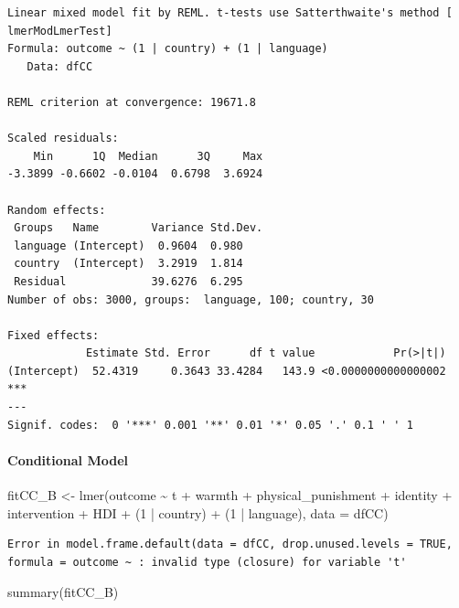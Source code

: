 \documentclass[
  letterpaper,
  DIV=11,
  numbers=noendperiod]{scrreprt}
\let\oldparagraph\paragraph
\renewcommand{\paragraph}[1]{\oldparagraph{#1}\mbox{}}
\newenvironment{Shaded}{\begin{snugshade}}{\end{snugshade}}
\newcommand{\AttributeTok}[1]{\textcolor[rgb]{0.40,0.45,0.13}{#1}}
\newcommand{\DecValTok}[1]{\textcolor[rgb]{0.68,0.00,0.00}{#1}}
\newcommand{\FunctionTok}[1]{\textcolor[rgb]{0.28,0.35,0.67}{#1}}
\newcommand{\NormalTok}[1]{\textcolor[rgb]{0.00,0.23,0.31}{#1}}
\newcommand{\OtherTok}[1]{\textcolor[rgb]{0.00,0.23,0.31}{#1}}
\newcommand{\SpecialCharTok}[1]{\textcolor[rgb]{0.37,0.37,0.37}{#1}}
\begin{document}
\begin{verbatim}
Linear mixed model fit by REML. t-tests use Satterthwaite's method [
lmerModLmerTest]
Formula: outcome ~ (1 | country) + (1 | language)
   Data: dfCC

REML criterion at convergence: 19671.8

Scaled residuals: 
    Min      1Q  Median      3Q     Max 
-3.3899 -0.6602 -0.0104  0.6798  3.6924 

Random effects:
 Groups   Name        Variance Std.Dev.
 language (Intercept)  0.9604  0.980   
 country  (Intercept)  3.2919  1.814   
 Residual             39.6276  6.295   
Number of obs: 3000, groups:  language, 100; country, 30

Fixed effects:
            Estimate Std. Error      df t value            Pr(>|t|)    
(Intercept)  52.4319     0.3643 33.4284   143.9 <0.0000000000000002 ***
---
Signif. codes:  0 '***' 0.001 '**' 0.01 '*' 0.05 '.' 0.1 ' ' 1
\end{verbatim}

\paragraph{Conditional Model}\label{conditional-model-4}

\begin{Shaded}
\begin{Highlighting}[]
\NormalTok{fitCC\_B }\OtherTok{\textless{}{-}} \FunctionTok{lmer}\NormalTok{(outcome }\SpecialCharTok{\textasciitilde{}}\NormalTok{ t }\SpecialCharTok{+}\NormalTok{ warmth }\SpecialCharTok{+}\NormalTok{ physical\_punishment }\SpecialCharTok{+} 
\NormalTok{                identity }\SpecialCharTok{+}\NormalTok{ intervention }\SpecialCharTok{+}\NormalTok{ HDI }\SpecialCharTok{+} 
\NormalTok{                (}\DecValTok{1} \SpecialCharTok{|}\NormalTok{ country) }\SpecialCharTok{+}
\NormalTok{                (}\DecValTok{1} \SpecialCharTok{|}\NormalTok{ language),}
              \AttributeTok{data =}\NormalTok{ dfCC)}
\end{Highlighting}
\end{Shaded}

\begin{verbatim}
Error in model.frame.default(data = dfCC, drop.unused.levels = TRUE, formula = outcome ~ : invalid type (closure) for variable 't'
\end{verbatim}

\begin{Shaded}
\begin{Highlighting}[]
\FunctionTok{summary}\NormalTok{(fitCC\_B)}
\end{Highlighting}
\end{Shaded}
\end{document}
